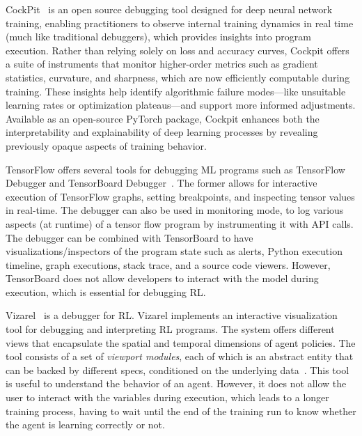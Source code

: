 CockPit~\cite{schneider21} is an open source debugging tool designed for deep neural network 
training, enabling practitioners to observe internal training dynamics in real time (much like 
traditional debuggers), which provides insights into program execution. Rather than relying solely on 
loss and accuracy curves, Cockpit offers a suite of instruments that monitor higher-order metrics such 
as gradient statistics, curvature, and sharpness, which are now efficiently computable during training. 
These insights help identify algorithmic failure modes—like unsuitable learning rates or optimization 
plateaus—and support more informed adjustments. Available as an open-source PyTorch package, 
Cockpit enhances both the interpretability and explainability of deep learning processes by revealing 
previously opaque aspects of training behavior.

TensorFlow offers several tools for debugging \ac{ML} programs such as TensorFlow Debugger 
and TensorBoard Debugger~\cite{tensorboard}. The former allows for interactive execution of 
TensorFlow graphs, setting breakpoints, and inspecting tensor values in real-time. The debugger 
can also be used in monitoring mode, to log various aspects (at runtime) of a tensor flow program 
by instrumenting it with API calls. The debugger can be combined with TensorBoard to have 
visualizations/inspectors of the program state such as alerts, Python execution timeline, graph 
executions, stack trace, and a source code viewers. However, TensorBoard does not allow 
developers to interact with the model during execution, which is essential for debugging \ac{RL}.

\ac{Vizarel}~\cite{deshpande20} is a debugger for \ac{RL}. \ac{Vizarel} implements an interactive 
visualization tool for debugging and interpreting \ac{RL} 
programs. The system offers different views that encapsulate the spatial and temporal dimensions 
of agent policies. The tool consists of a set of \emph{viewport modules}, each of which is an 
abstract entity that can be backed by different specs, conditioned on the underlying 
data~\cite{deshpande20}. This tool is useful to understand the behavior of an agent. However, it 
does not allow the user to interact with the variables during execution, which leads to a longer training 
process, having to wait until the end of the training run to know whether the agent is learning correctly 
or not.

